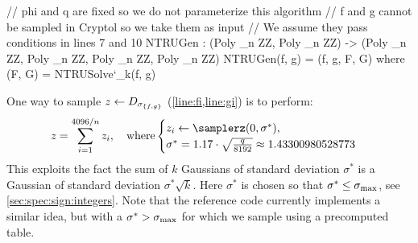 \begin{algorithm}%
  \caption{$\ntrugen(\phi, q)$ \hfill}\label{alg:ntrugen}
 \begin{algorithmic}[1]
  \label{step:genfg}
  \label{line:sigmafg} 
  \EndFor
  \label{line:fi}
  \label{line:gi}
  \label{step:ntt} 
  \Restart
  \EndIf
  \label{line:gamma}
  \Restart
  \EndIf\label{step:endgenfg}
   
  \label{line:botntrusolve}
  \Restart\label{line:botntrusolverestart}
  \EndIf
  \end{algorithmic}
\end{algorithm}

\begin{code}
  // phi and q are fixed so we do not parameterize this algorithm
  // f and g cannot be sampled in Cryptol so we take them as input
  // We assume they pass conditions in lines 7 and 10
  NTRUGen : (Poly _n ZZ, Poly _n ZZ) ->
    (Poly _n ZZ, Poly _n ZZ, Poly _n ZZ, Poly _n ZZ)
  NTRUGen(f, g) = (f, g, F, G) where
    (F, G) = NTRUSolve`{_k}(f, g)
\end{code}

\newcommand{\sigmastar}{{\sigma^*}}
One way to sample $z \gets D_{\sigma_{\{f,g\}}}$ (\cref{line:fi,line:gi}) is to perform:
\begin{equation}\label{eq:sigmastar}
z = \sum_{i = 1}^{4096/n} z_i, \quad \text{where} \begin{cases}
z_i \gets \samplerz(0, \sigmastar),\\
\sigmastar = 1.17 \cdot \sqrt\frac{q}{8192} \approx 1.43300980528773
\end{cases}
\end{equation}
This exploits the fact the sum of $k$ Gaussians of standard deviation $\sigmastar$ is a Gaussian of standard deviation $\sigmastar \sqrt{k}$. Here $\sigmastar$ is chosen so that $\sigmastar \leq \sigmax$, see \cref{sec:spec:sign:integers}. Note that the reference code currently implements a similar idea, but with a $\sigmastar > \sigmax$ for which we sample using a precomputed table.

